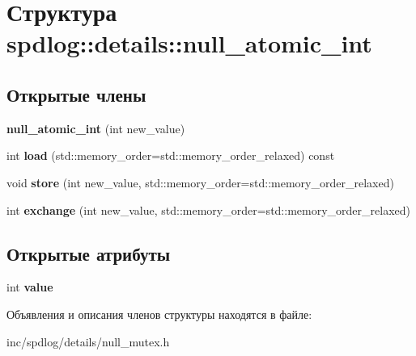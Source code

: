 \hypertarget{structspdlog_1_1details_1_1null__atomic__int}{}\section{Структура spdlog\+:\+:details\+:\+:null\+\_\+atomic\+\_\+int}
\label{structspdlog_1_1details_1_1null__atomic__int}
\subsection*{Открытые члены}
\begin{DoxyCompactItemize}
\item 
\mbox{\label{structspdlog_1_1details_1_1null__atomic__int_aab021478f3b1c5f14375fe0a628c51b5}} 
{\bfseries null\+\_\+atomic\+\_\+int} (int new\+\_\+value)
\item 
\mbox{\label{structspdlog_1_1details_1_1null__atomic__int_aaa0cfd07cce6c8a77a4e2d17f8d77a3b}} 
int {\bfseries load} (std\+::memory\+\_\+order=std\+::memory\+\_\+order\+\_\+relaxed) const
\item 
\mbox{\label{structspdlog_1_1details_1_1null__atomic__int_af36ba272f3e588d5171182908209a41c}} 
void {\bfseries store} (int new\+\_\+value, std\+::memory\+\_\+order=std\+::memory\+\_\+order\+\_\+relaxed)
\item 
\mbox{\label{structspdlog_1_1details_1_1null__atomic__int_a06c8004b92baae921b21ae7aa99947f9}} 
int {\bfseries exchange} (int new\+\_\+value, std\+::memory\+\_\+order=std\+::memory\+\_\+order\+\_\+relaxed)
\end{DoxyCompactItemize}
\subsection*{Открытые атрибуты}
\begin{DoxyCompactItemize}
\item 
\mbox{\label{structspdlog_1_1details_1_1null__atomic__int_ab433069a53cdd1402dc7b0b942d7095f}} 
int {\bfseries value}
\end{DoxyCompactItemize}


Объявления и описания членов структуры находятся в файле\+:\begin{DoxyCompactItemize}
\item 
inc/spdlog/details/null\+\_\+mutex.\+h\end{DoxyCompactItemize}
